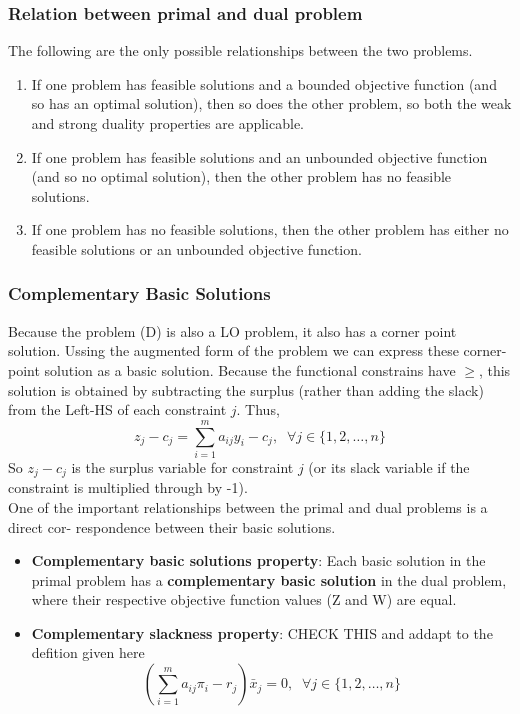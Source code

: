 \subsubsection{Relation between primal and dual problem}
The following are the only possible relationships between the two problems.
\begin{enumerate}
     \item If one problem has feasible solutions and a bounded objective function (and
     so has an optimal solution), then so does the other problem, so both the weak
     and strong duality properties are applicable.
     \item If one problem has feasible solutions and an unbounded objective function
     (and so no optimal solution), then the other problem has no feasible solutions.
     \item If one problem has no feasible solutions, then the other problem has either no
     feasible solutions or an unbounded objective function.
\end{enumerate}

\subsubsection{Complementary Basic Solutions}
Because the problem (D) is also a LO problem, it also has a corner point solution. Ussing the augmented form of the problem 
we can express these corner-point solution as a basic solution. Because the functional constrains have $\geq$, this solution
is obtained by subtracting the surplus (rather than adding the slack) from the Left-HS of each constraint $j$. Thus,
\[ z_j - c_j = \sum_{i=1}^m a_{ij}y_i - c_j,\;\; \forall j \in \{1,2,\dots,n\} \]
So $z_j-c_j$ is the \textbf{}{surplus variable} for constraint $j$ (or its slack variable if
the constraint is multiplied through by -1). \\

One of the important relationships between the primal and dual problems is a direct cor-
respondence between their basic solutions.
\begin{itemize}
    \item \textbf{Complementary basic solutions property}: Each basic solution in the primal
    problem has a \textbf{complementary basic solution} in the dual problem, where their
    respective objective function values (Z and W) are equal.
    \item \textbf{Complementary slackness property}: CHECK THIS and addapt to the defition given here
    \[ (\sum_{i=1}^m a_{ij}\pi_i - r_j) \bar{x}_j = 0, \;\; \forall j \in \{ 1,2,\dots,n \} \]
\end{itemize}


